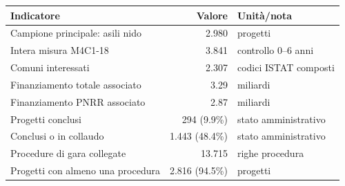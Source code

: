 \begin{tabular}{lrl}
\toprule
Indicatore & Valore & Unità/nota \\
\midrule
Campione principale: asili nido & 2.980 & progetti \\
Intera misura M4C1-18 & 3.841 & controllo 0--6 anni \\
Comuni interessati & 2.307 & codici ISTAT composti \\
Finanziamento totale associato & \texteuro{}3.29 & miliardi \\
Finanziamento PNRR associato & \texteuro{}2.87 & miliardi \\
Progetti conclusi & 294 (9.9\%) & stato amministrativo \\
Conclusi o in collaudo & 1.443 (48.4\%) & stato amministrativo \\
Procedure di gara collegate & 13.715 & righe procedura \\
Progetti con almeno una procedura & 2.816 (94.5\%) & progetti \\
\bottomrule
\end{tabular}
